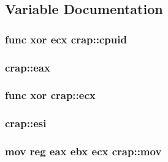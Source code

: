 \subsection{Variable Documentation}
\hypertarget{namespacecrap_a62bfdd51e772a94b9fe3d67c13f224d0}{
\subsubsection[{cpuid}]{ func xor {\bf ecx} crap\-::cpuid}}\label{namespacecrap_a62bfdd51e772a94b9fe3d67c13f224d0}
\hypertarget{namespacecrap_aed325f6a8892f32051d8c544ae363a1d}{
\subsubsection[{eax}]{ crap\-::eax}}\label{namespacecrap_aed325f6a8892f32051d8c544ae363a1d}
\hypertarget{namespacecrap_afe3d8527ce831ea0b8f9568c5c7deb52}{
\subsubsection[{ecx}]{ func xor crap\-::ecx}}\label{namespacecrap_afe3d8527ce831ea0b8f9568c5c7deb52}
\hypertarget{namespacecrap_a6e5ea7303bfa9d0671c2c69bcfb39331}{
\subsubsection[{esi}]{ crap\-::esi}}\label{namespacecrap_a6e5ea7303bfa9d0671c2c69bcfb39331}
\hypertarget{namespacecrap_a35f9ce3ce7462beeee43dbea46f2b509}{
\subsubsection[{mov}]{\setlength{\rightskip}{0pt plus 5cm}mov reg {\bf eax} ebx {\bf ecx} crap\-::mov}}\label{namespacecrap_a35f9ce3ce7462beeee43dbea46f2b509}
